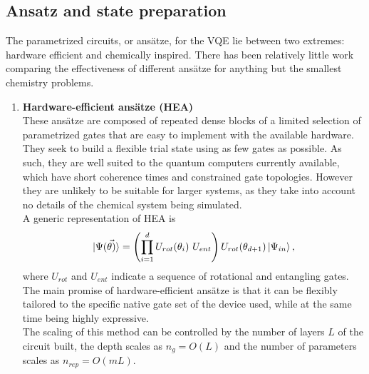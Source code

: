 \subsection{Ansatz and state preparation}
The parametrized circuits, or ansätze, for the VQE lie between two extremes: hardware efficient and chemically inspired. There has been relatively little work comparing the effectiveness of different ansätze for anything but the smallest chemistry problems.
\begin{enumerate}
    \item \textbf{Hardware-efficient ansätze (HEA)} \\
    These ansätze are composed of repeated dense blocks of a limited selection of parametrized gates that are easy to implement with the available hardware. They seek to build a flexible trial state using as few gates as possible. As such, they are well suited to the quantum computers currently available, which have short coherence times and constrained gate topologies. However they are unlikely to be suitable for larger systems, as they take into account no details of the chemical system being simulated. \\
    A generic representation of HEA is
    \begin{equation}
        |\Psi(\vec{\theta)}\rangle = \left( \prod_{i=1}^d U_{rot}(\theta_i) \ U_{ent} \right) U_{rot}(\theta_{d+1}) \ket{\Psi_{in}},
    \end{equation}
    where $U_{rot}$ and $U_{ent}$ indicate a sequence of rotational and entangling gates. \\
    The main promise of hardware-efficient ansätze is that it can be flexibly tailored to the specific native gate set of the device used, while at the same time being highly expressive. \\
    The scaling of this method can be controlled by the number of layers $L$ of the circuit built, the depth scales as $n_g = O(L)$ and the number of parameters scales as $n_{rep} = O(m L)$.
    

\end{enumerate}
